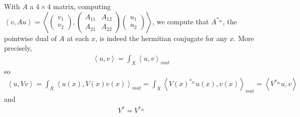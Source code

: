\documentclass[11pt,a4paper,reqno,french,tikz]{amsart}
\newcommand{\ps}[1]{\left< #1 \right>} %
\newcommand{\mat}[1]{\begin{pmatrix} #1 \end{pmatrix}} %
\begin{document}
With $A$ a $4 \times 4$ matrix, computing $\ps{v, A u} = \ps{\mat{v_1 \\ v_2},\mat{A_{11} & A_{12} \\ A_{21} & A_{22}} \mat{u_1\\u_2}}$, we compute that $A^{*_m}$, the pointwise dual of $A$ at each $x$, is indeed the hermitian conjugate for any $x$. More precisely,
\begin{align*}
\ps{u,v} = \int_X \ps{u,v}_{mat}
\end{align*}
so
\begin{align*}
\ps{u,V v} = \int_X \ps{u(x),V(x) v(x)}_{mat} = \int_X \ps{V(x)^{*_m} u(x),v(x)}_{mat} = \ps{V^{*_m} u,v}
\end{align*}
and
\begin{align*}
\boxed{V^* = V^{*_m}}
\end{align*}
\end{document}

